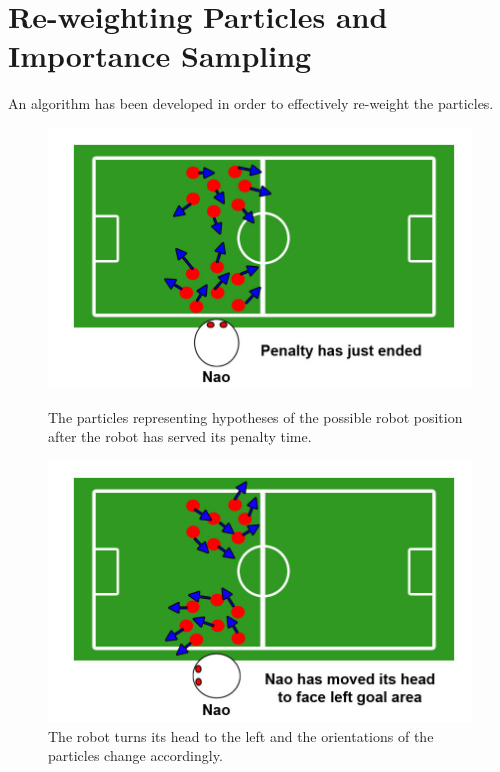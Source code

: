 \documentclass{report}
\begin{document}
\section{Re-weighting Particles and Importance Sampling}
\label{sec:reweighting}
An algorithm has been developed in order to effectively re-weight the particles.
\begin{figure}
\begin{minipage}[b]{0.5\linewidth}
\includegraphics[scale=0.2]{../Drawings/localisation/localisationAlgorithmPenaltyEnded.jpg}
\caption{The particles representing hypotheses of the possible robot position after the robot has served its penalty time.}
\label{fig:penaltyOver}
\end{minipage}
\hspace{0.5cm}
\begin{minipage}[b]{0.5\linewidth}
\includegraphics[scale=0.2]{../Drawings/localisation/localisationAlgorithmTurnedLeft.jpg}
\caption{The robot turns its head to the left and the orientations of the particles change accordingly.}

\end{minipage}
\end{figure}
\end{document}

